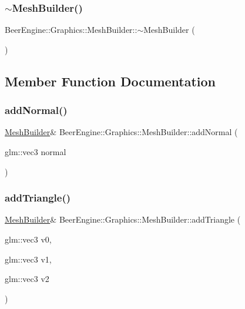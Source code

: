 \subsubsection{\texorpdfstring{$\sim$\+Mesh\+Builder()}{~MeshBuilder()}}
{\footnotesize\ttfamily Beer\+Engine\+::\+Graphics\+::\+Mesh\+Builder\+::$\sim$\+Mesh\+Builder (\begin{DoxyParamCaption}{ }\end{DoxyParamCaption})}



\subsection{Member Function Documentation}
\mbox{\label{class_beer_engine_1_1_graphics_1_1_mesh_builder_a2b60b866d1d46a2011dd7ea406613337}} 
\subsubsection{\texorpdfstring{add\+Normal()}{addNormal()}}
{\footnotesize\ttfamily \mbox{\hyperlink{class_beer_engine_1_1_graphics_1_1_mesh_builder}{Mesh\+Builder}}\& Beer\+Engine\+::\+Graphics\+::\+Mesh\+Builder\+::add\+Normal (\begin{DoxyParamCaption}\item[{glm\+::vec3}]{normal }\end{DoxyParamCaption})}

\mbox{\label{class_beer_engine_1_1_graphics_1_1_mesh_builder_ad652a03729f4938ce4d198edf4ab6abe}} 
\subsubsection{\texorpdfstring{add\+Triangle()}{addTriangle()}}
{\footnotesize\ttfamily \mbox{\hyperlink{class_beer_engine_1_1_graphics_1_1_mesh_builder}{Mesh\+Builder}}\& Beer\+Engine\+::\+Graphics\+::\+Mesh\+Builder\+::add\+Triangle (\begin{DoxyParamCaption}\item[{glm\+::vec3}]{v0,  }\item[{glm\+::vec3}]{v1,  }\item[{glm\+::vec3}]{v2 }\end{DoxyParamCaption})}

